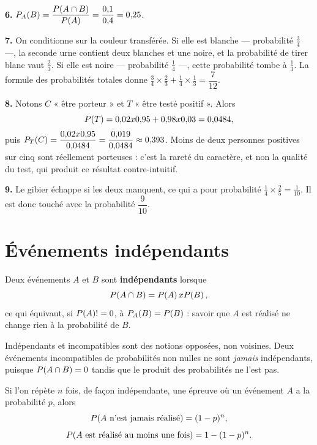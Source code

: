 \begin{corrige}
\textbf{6.} $\probacond{B}{A} = \dfrac{\proba{A \cap B}}{\proba{A}}
= \dfrac{0{,}1}{0{,}4} = 0{,}25$.

\textbf{7.} On conditionne sur la couleur transférée. Si elle est blanche —
probabilité $\frac34$ —, la seconde urne contient deux blanches et une noire,
et la probabilité de tirer blanc vaut $\frac23$. Si elle est noire —
probabilité $\frac14$ —, cette probabilité tombe à $\frac13$. La formule des
probabilités totales donne
$\frac34 \times \frac23+\frac14 \times \frac13 = \dfrac{7}{12}$.

\textbf{8.} Notons $C$ « être porteur » et $T$ « être testé positif ». Alors
\[
  \proba{T} = 0{,}02 \times 0{,}95+0{,}98 \times 0{,}03 = 0{,}0484,
\]
puis $\probacond{C}{T} = \dfrac{0{,}02 \times 0{,}95}{0{,}0484}
= \dfrac{0{,}019}{0{,}0484} \approx 0{,}393$. Moins de deux personnes
positives sur cinq sont réellement porteuses : c'est la rareté du caractère,
et non la qualité du test, qui produit ce résultat contre-intuitif.

\textbf{9.} Le gibier échappe si les deux manquent, ce qui a pour probabilité
$\frac14 \times \frac25 = \frac{1}{10}$. Il est donc touché avec la
probabilité $\dfrac{9}{10}$.
\end{corrige}

\section{Événements indépendants}

\begin{definition}[indépendance]
Deux événements $A$ et $B$ sont \textbf{indépendants} lorsque
\[
  \proba{A \cap B} = \proba{A} \times \proba{B},
\]
ce qui équivaut, si $\proba{A} \neq 0$, à
$\probacond{B}{A} = \proba{B}$ : savoir que $A$ est réalisé ne change rien à
la probabilité de $B$.
\end{definition}

\begin{avertissement}
Indépendants et incompatibles sont des notions opposées, non voisines. Deux
événements incompatibles de probabilités non nulles ne sont \emph{jamais}
indépendants, puisque $\proba{A \cap B} = 0$ tandis que le produit des
probabilités ne l'est pas.
\end{avertissement}

\begin{propriete}
Si l'on répète $n$ fois, de façon indépendante, une épreuve où un événement
$A$ a la probabilité $p$, alors
\[
  \proba{\text{$A$ n'est jamais réalisé}} = (1-p)^{n},
\]
\[
  \proba{\text{$A$ est réalisé au moins une fois}} = 1-(1-p)^{n}.
\]
\end{propriete}

